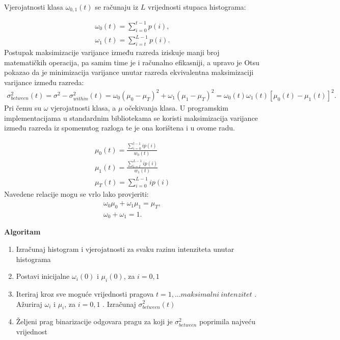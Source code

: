 \documentclass[times, utf8, diplomski]{fer}
\theoremstyle{definition}
\begin{document}
Vjerojatnosti klasa $\omega_{0,1}(t)$ se računaju iz $L$ vrijednosti stupaca histograma:

\begin{equation}
\begin{aligned}
\omega_0(t) = \sum_{i=0}^{t-1}p(i), \\
\omega_1(t) = \sum_{i=t}^{L-1}p(i).
\end{aligned}
\end{equation}
Postupak maksimizacije varijance između razreda iziskuje manji broj matematičkih operacija, pa samim time je i računalno efikasniji, a upravo je Otsu pokazao da je minimizacija varijance unutar razreda ekvivalentna maksimizaciji varijance između razreda:
\begin{equation}
\begin{aligned}
\sigma^2_{between}(t) = \sigma^2 - \sigma^2_{within}(t) = \omega_0(\mu_0 - \mu_T)^2 + \omega_1(\mu_1 - \mu_T)^2 = \omega_0(t)\omega_1(t)[\mu_0(t) - \mu_1(t)]^2.
\end{aligned}
\end{equation}
Pri čemu su $\omega$ vjerojatnosti klasa, a $\mu$ očekivanja klasa.
U programskim implementacijama u standardnim bibliotekama se koristi maksimizacija varijance između razreda iz spomenutog razloga te je ona korištena i u ovome radu.


\begin{equation}
\begin{aligned}
\mu_0(t) = \frac{\sum_{i=0}^{t-1}ip(i)}{w_0(t)} \\
\mu_1(t) = \frac{\sum_{i=t}^{L-1}ip(i)}{w_1(t)} \\
\mu_T(t) = \sum_{i=0}^{L-1}ip(i)
\end{aligned}
\end{equation}
Navedene relacije mogu se vrlo lako provjeriti:
\begin{equation}
\begin{aligned}
\omega_0\mu_0 + \omega_1\mu_1 = \mu_T, \\
\omega_0 + \omega_1 = 1.
\end{aligned}
\end{equation}

\textbf{Algoritam}

\begin{enumerate}
\item Izračunaj histogram i vjerojatnosti za svaku razinu intenziteta unutar histograma
\item Postavi inicijalne $\omega_i(0)$ i $\mu_i(0)$, za $i=0, 1$
\item Iteriraj kroz sve moguće vrijednosti pragova $t=1,...maksimalni\ intenzitet$
. Ažuriraj $\omega_i$ i $\mu_i$, za $i=0, 1$
. Izračunaj $\sigma^2_{between}(t)$
\item Željeni prag binarizacije odgovara pragu za koji je $\sigma^2_{between}$ poprimila najveću vrijednost
\end{enumerate}
\end{document}
